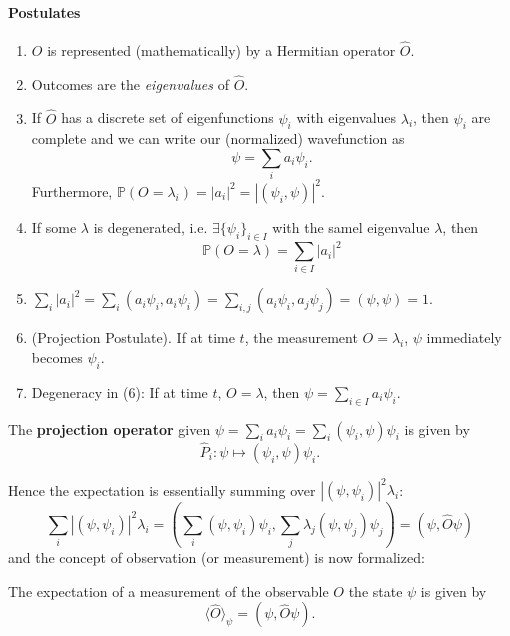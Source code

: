 \documentclass[a4paper,11pt]{article}
\begin{document}
\paragraph{Postulates} 
\begin{enumerate}[(1)]
    \item $O$ is represented (mathematically) by a Hermitian operator $\hat{O}$. 
    \item Outcomes are the \textit{eigenvalues} of $\hat{O}$. 
    \item If $\hat{O}$ has a discrete set of eigenfunctions $ \psi_i $ with eigenvalues $ \lambda_i $, then $ \psi_i $ are complete and we can write our (normalized) wavefunction as 
    \[
        \psi = \sum_{i} a_i \psi_i. 
    \]
    Furthermore, $ \mathbb{P}(O = \lambda_i) = |a_i|^2 = |(\psi_i,\psi)|^2 $. 
    \item If some $\lambda$ is degenerated, i.e. $ \exists \{\psi_i\}_{i\in I} $ with the samel eigenvalue $\lambda$, then
    \[
        \mathbb{P}(O=\lambda) = \sum_{i\in I} |a_i|^2
    \]
    \item $\displaystyle \sum_i\left|a_i\right|^2=\sum_i\left(a_i \psi_i, a_i \psi_i\right)=\sum_{i, j}\left(a_i \psi_i, a_j \psi_j\right)=(\psi, \psi)=1$. 
    \item (Projection Postulate). If at time $t$, the measurement $ O=\lambda_i $, $ \psi $ immediately becomes $\psi_i$.  
    \item Degeneracy in (6): If at time $t$, $ O = \lambda $, then $ \psi = \sum_{i\in I} a_i \psi_i $. 
\end{enumerate}

\begin{definition}
    The \textbf{projection operator} given $ \psi = \sum_i a_i \psi_i = \sum_i (\psi_i,\psi)\psi_i $ is given by 
    \[
        \hat{P}_i: \psi \mapsto (\psi_i,\psi)\psi_i. 
    \]
\end{definition}

Hence the expectation is essentially summing over $ |(\psi,\psi_i)|^2 \lambda_i $: 
\[
    \sum_i\left|\left(\psi, \psi_i\right)\right|^2 \lambda_i 
        =\left(\sum_i\left(\psi, \psi_i\right) \psi_i, \sum_j \lambda_j\left(\psi, \psi_j\right) \psi_j\right)=(\psi, \hat{O} \psi)
\]
and the concept of observation (or measurement) is now formalized: 
\begin{proposition}
    The expectation of a measurement of the observable $O$ the state $\psi$ is given by 
    \[
        \langle \hat{O} \rangle_{\psi} = (\psi, \hat{O}\psi).
    \]
\end{proposition}
\end{document}
